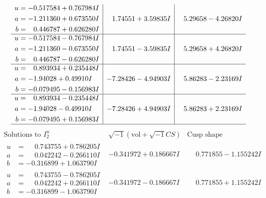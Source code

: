 \documentclass[1p]{elsarticle_modified}
\theoremstyle{definition}
\newcommand{\I}{\sqrt{-1}}
\begin{document}
$$\begin{array}{c|c|c}
\begin{aligned}
u &= -0.517584 + 0.767984 I \\
a &= -1.211360 + 0.673550 I \\
b &= \phantom{-}0.446787 + 0.626280 I\end{aligned}
 & \phantom{-}1.74551 + 3.59835 I & \phantom{-}5.29658 - 4.26820 I \\ \hline\begin{aligned}
u &= -0.517584 - 0.767984 I \\
a &= -1.211360 - 0.673550 I \\
b &= \phantom{-}0.446787 - 0.626280 I\end{aligned}
 & \phantom{-}1.74551 - 3.59835 I & \phantom{-}5.29658 + 4.26820 I \\ \hline\begin{aligned}
u &= \phantom{-}0.893934 + 0.235448 I \\
a &= -1.94028 + 0.49910 I \\
b &= -0.079495 - 0.156983 I\end{aligned}
 & -7.28426 - 4.94903 I & \phantom{-}5.86283 - 2.23169 I \\ \hline\begin{aligned}
u &= \phantom{-}0.893934 - 0.235448 I \\
a &= -1.94028 - 0.49910 I \\
b &= -0.079495 + 0.156983 I\end{aligned}
 & -7.28426 + 4.94903 I & \phantom{-}5.86283 + 2.23169 I\\
 \hline 
 \end{array}$$\newpage$$\begin{array}{c|c|c}  
\text{Solutions to }I^u_{2}& \I (\text{vol} + \sqrt{-1}CS) & \text{Cusp shape}\\
 \hline 
\begin{aligned}
u &= \phantom{-}0.743755 + 0.786205 I \\
a &= \phantom{-}0.042242 - 0.266110 I \\
b &= -0.316899 + 1.063790 I\end{aligned}
 & -0.341972 + 0.186667 I & \phantom{-}0.771855 - 1.155242 I \\ \hline\begin{aligned}
u &= \phantom{-}0.743755 - 0.786205 I \\
a &= \phantom{-}0.042242 + 0.266110 I \\
b &= -0.316899 - 1.063790 I\end{aligned}
 & -0.341972 - 0.186667 I & \phantom{-}0.771855 + 1.155242 I \\ \hline\begin{aligned}

\end{aligned}
\end{array}$$
\end{document}
